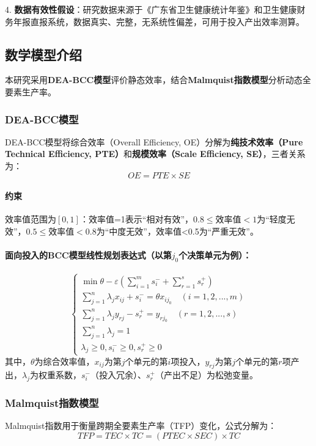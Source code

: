 \documentclass{MathNoteCN}
\begin{document}
4. \textbf{数据有效性假设}：研究数据来源于《广东省卫生健康统计年鉴》和卫生健康财务年报直报系统，数据真实、完整，无系统性偏差，可用于投入产出效率测算\cite{chen2025}。


\subsection{数学模型介绍}
本研究采用\textbf{DEA-BCC模型}评价静态效率，结合\textbf{Malmquist指数模型}分析动态全要素生产率。

\subsubsection{DEA-BCC模型}
DEA-BCC模型将综合效率（Overall Efficiency, OE）分解为\textbf{纯技术效率（Pure Technical Efficiency, PTE）}和\textbf{规模效率（Scale Efficiency, SE）}，三者关系为：
\newpage
\[OE = PTE \times SE\]  
\paragraph{约束}效率值范围为$[0,1]$：效率值=1表示“相对有效”，$0.8 \leq \text{效率值}<1$为“轻度无效”，$0.5 \leq \text{效率值}<0.8$为“中度无效”，效率值<0.5为“严重无效”\cite{chen2025}。  
\paragraph{面向投入的BCC模型线性规划表达式（以第$j_0$个决策单元为例）：}  
  \[
  \begin{cases} 
  \min \theta - \varepsilon \left( \sum_{i=1}^m s_i^- + \sum_{r=1}^s s_r^+ \right) \\
  \sum_{j=1}^n \lambda_j x_{ij} + s_i^- = \theta x_{ij_0} \quad (i=1,2,...,m) \\
  \sum_{j=1}^n \lambda_j y_{rj} - s_r^+ = y_{rj_0} \quad (r=1,2,...,s) \\
  \sum_{j=1}^n \lambda_j = 1 \\
  \lambda_j \geq 0, s_i^- \geq 0, s_r^+ \geq 0 
  \end{cases}
  \]  
  其中，$\theta$为综合效率值，$x_{ij}$为第$j$个单元的第$i$项投入，$y_{rj}$为第$j$个单元的第$r$项产出，$\lambda_j$为权重系数，$s_i^-$（投入冗余）、$s_r^+$（产出不足）为松弛变量\cite{chen2025}。

\subsubsection{Malmquist指数模型}
Malmquist指数用于衡量跨期全要素生产率（TFP）变化，公式分解为：  
\[TFP = TEC \times TC = (PTEC \times SEC) \times TC\]
\end{document}
